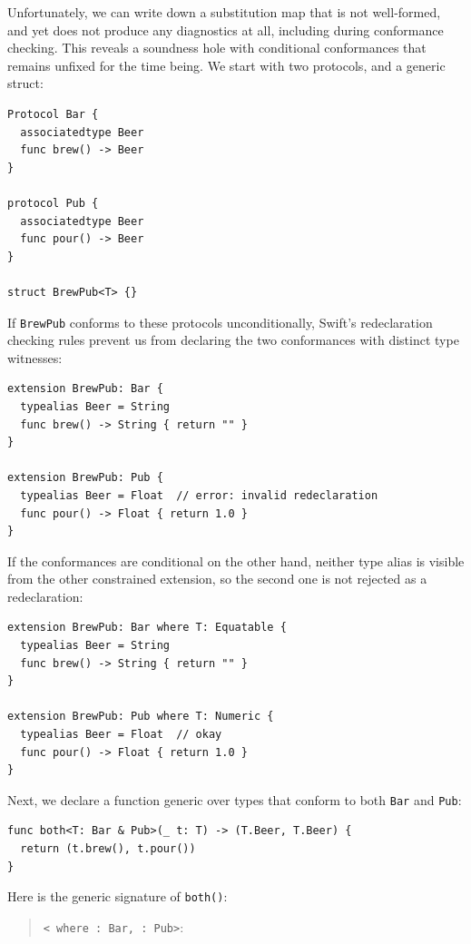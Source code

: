 \documentclass[../generics]{subfiles}
\begin{document}
\begin{example}
Unfortunately, we can write down a substitution map that is not well-formed, and yet  does not produce any diagnostics at all, including during conformance checking. This reveals a soundness hole with conditional conformances that remains unfixed for the time being. We start with two protocols, and a generic struct:
\begin{Verbatim}
Protocol Bar {
  associatedtype Beer
  func brew() -> Beer
}

protocol Pub {
  associatedtype Beer
  func pour() -> Beer
}

struct BrewPub<T> {}
\end{Verbatim}
If \texttt{BrewPub} conforms to these protocols unconditionally, Swift's redeclaration checking rules prevent us from declaring the two conformances with distinct type witnesses:
\begin{Verbatim}
extension BrewPub: Bar {
  typealias Beer = String
  func brew() -> String { return "" }
}

extension BrewPub: Pub {
  typealias Beer = Float  // error: invalid redeclaration
  func pour() -> Float { return 1.0 }
}
\end{Verbatim}
If the conformances are conditional on the other hand, neither type alias is visible from the other constrained extension, so the second one is not rejected as a redeclaration:
\begin{Verbatim}
extension BrewPub: Bar where T: Equatable {
  typealias Beer = String
  func brew() -> String { return "" }
}

extension BrewPub: Pub where T: Numeric {
  typealias Beer = Float  // okay
  func pour() -> Float { return 1.0 }
}
\end{Verbatim}
Next, we declare a function generic over types that conform to both \texttt{Bar} and \texttt{Pub}:
\begin{Verbatim}
func both<T: Bar & Pub>(_ t: T) -> (T.Beer, T.Beer) {
  return (t.brew(), t.pour())
}
\end{Verbatim}
Here is the generic signature of \texttt{both()}:
\begin{quote}
\texttt{<\rT\ where \rT:~Bar, \rT:~Pub>}:
\end{quote}


\end{example}
\end{document}
